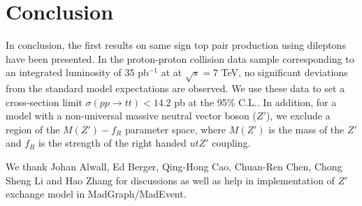 \section{Conclusion}
\label{sec:conclusion}
In conclusion, the first results on same sign top pair production using 
dileptons have been presented. 
In the proton-proton collision data sample corresponding to an 
integrated luminosity of 35 pb$^{-1}$ at at $\sqrt{s} = 7 $ TeV, 
no significant deviations from the standard model expectations are observed. 
We use these data to set a cross-section limit $\sigma(pp \to tt) < 14.2$ pb at the 95\% C.L..
In addition, for a model with a non-universal massive neutral vector boson ($Z'$), we exclude 
a region of the $M(Z')-f_R$ parameter space, where $M(Z')$ is the mass of the $Z'$ 
and $f_R$ is the strength of the right handed $utZ'$ coupling.



\ack

We thank Johan Alwall, Ed Berger, Qing-Hong Cao, Chuan-Ren Chen, Chong Sheng Li and Hao Zhang for 
discussions as well as help in implementation of $Z'$ exchange model in MadGraph/MadEvent. 


